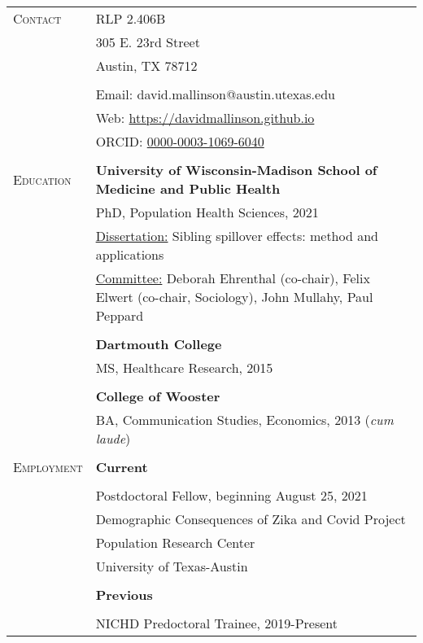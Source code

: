 \documentclass[letterpaper,10pt,oneside]{article}
\begin{document}
\begin{longtable}{@{} p{} p{}}
\textsc{Contact}   & RLP 2.406B \\
     & 305 E. 23rd Street \\
     & Austin, TX 78712 \\
     & \\
     & Email: david.mallinson@austin.utexas.edu \\
     & Web: \href{https://davidmallinson.github.io}{https://davidmallinson.github.io} \\
     & ORCID: \href{https://orcid.org/0000-0003-1069-6040/}{0000-0003-1069-6040} \\
     & \\
\textsc{Education}    & \textbf{University of Wisconsin-Madison School of Medicine and Public Health} \\
     & PhD, Population Health Sciences, 2021 \\
     & \parbox{6.15in}{\underline{Dissertation:} Sibling spillover effects: method and applications} \\
     & \parbox{6.15in}{\underline{Committee:} Deborah Ehrenthal (co-chair), Felix Elwert (co-chair, Sociology), John Mullahy, Paul Peppard} \\
     & \\
     & \textbf{Dartmouth College} \\
     & MS, Healthcare Research, 2015 \\
     & \\
     & \textbf{College of Wooster} \\
     & BA, Communication Studies, Economics, 2013 (\textit{cum laude}) \\
     & \\
\textsc{Employment} & \textbf{Current} \\
     & \\
& Postdoctoral Fellow, beginning August 25, 2021 \\
     & Demographic Consequences of Zika and Covid Project  \\
     & Population Research Center \\
     & University of Texas-Austin \\
     & \\
     & \textbf{Previous} \\
     & \\
& NICHD Predoctoral Trainee, 2019-Present \\

\end{longtable}
\end{document}
